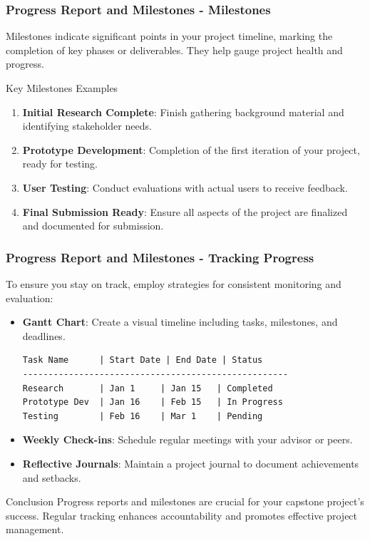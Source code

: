 \documentclass{beamer}
\begin{document}
\begin{frame}[fragile]
    \frametitle{Progress Report and Milestones - Milestones}
    Milestones indicate significant points in your project timeline, marking the completion of key phases or deliverables. They help gauge project health and progress. 

    \begin{block}{Key Milestones Examples}
        \begin{enumerate}
            \item \textbf{Initial Research Complete}: Finish gathering background material and identifying stakeholder needs.
            \item \textbf{Prototype Development}: Completion of the first iteration of your project, ready for testing.
            \item \textbf{User Testing}: Conduct evaluations with actual users to receive feedback.
            \item \textbf{Final Submission Ready}: Ensure all aspects of the project are finalized and documented for submission.
        \end{enumerate}
    \end{block}
\end{frame}

\begin{frame}[fragile]
    \frametitle{Progress Report and Milestones - Tracking Progress}
    To ensure you stay on track, employ strategies for consistent monitoring and evaluation:

    \begin{itemize}
        \item \textbf{Gantt Chart}: Create a visual timeline including tasks, milestones, and deadlines.
        \begin{lstlisting}
Task Name      | Start Date | End Date | Status
----------------------------------------------------
Research       | Jan 1     | Jan 15   | Completed
Prototype Dev  | Jan 16    | Feb 15   | In Progress
Testing        | Feb 16    | Mar 1    | Pending
        \end{lstlisting}
        
        \item \textbf{Weekly Check-ins}: Schedule regular meetings with your advisor or peers.
        \item \textbf{Reflective Journals}: Maintain a project journal to document achievements and setbacks.
    \end{itemize}

    \begin{block}{Conclusion}
        Progress reports and milestones are crucial for your capstone project’s success. 
        Regular tracking enhances accountability and promotes effective project management.
    \end{block}
\end{frame}
\end{document}
